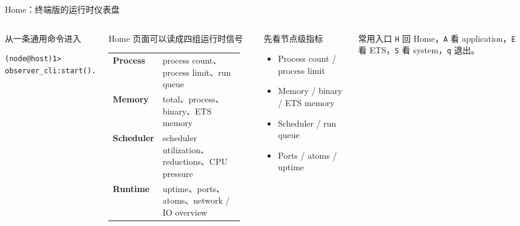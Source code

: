 \documentclass[aspectratio=169, 9pt]{beamer}
\newcommand{\code}[1]{\texttt{#1}}
\begin{document}
\begin{frame}[fragile]{Home：终端版的运行时仪表盘}
  \begin{columns}[T,onlytextwidth]
    \begin{block}{从一条通用命令进入}
\begin{lstlisting}
(node@host)1> observer_cli:start().
\end{lstlisting}
    \end{block}
    \begin{exampleblock}{Home 页面可以读成四组运行时信号}
      {\scriptsize
      \begin{tabular}{@{}p{0.29\linewidth}p{0.63\linewidth}@{}}
        \textbf{Process} & process count、process limit、run queue \\
        \textbf{Memory} & total、process、binary、ETS memory \\
        \textbf{Scheduler} & scheduler utilization、reductions、CPU pressure \\
        \textbf{Runtime} & uptime、ports、atoms、network / IO overview \\
      \end{tabular}}
    \end{exampleblock}
    \begin{block}{先看节点级指标}
      \begin{itemize}
        \item Process count / process limit
        \item Memory / binary / ETS memory
        \item Scheduler / run queue
        \item Ports / atoms / uptime
      \end{itemize}
    \end{block}
    \begin{exampleblock}{常用入口}
      \code{H} 回 Home，\code{A} 看 application，\code{E} 看 ETS，\code{S} 看 system，\code{q} 退出。
    \end{exampleblock}
  \end{columns}
\end{frame}
\end{document}
